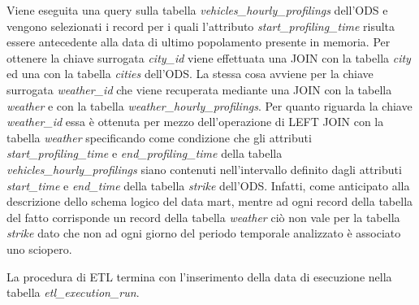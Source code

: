 Viene eseguita una query sulla tabella \textit{vehicles\_hourly\_profilings}
dell'ODS e vengono selezionati i record per i quali l'attributo
\textit{start\_profiling\_time} risulta essere antecedente alla data di ultimo
popolamento presente in memoria. Per ottenere la chiave surrogata \textit{city\_id}
viene effettuata una JOIN con la tabella \textit{city} ed una con la tabella
\textit{cities} dell'ODS. La stessa cosa avviene per la chiave surrogata
\textit{weather\_id} che viene recuperata mediante una JOIN con la tabella
\textit{weather} e con la tabella \textit{weather\_hourly\_profilings}.
Per quanto riguarda la chiave \textit{weather\_id} essa è ottenuta per mezzo
dell'operazione di LEFT JOIN con la tabella \textit{weather} specificando
come condizione che gli attributi \textit{start\_profiling\_time} e
\textit{end\_profiling\_time} della tabella \textit{vehicles\_hourly\_profilings}
siano contenuti nell'intervallo definito dagli attributi \textit{start\_time} e
\textit{end\_time} della tabella \textit{strike} dell'ODS. Infatti, come anticipato
alla descrizione dello schema logico del data mart, mentre ad ogni record della
tabella del fatto corrisponde un record della tabella \textit{weather} ciò non
vale per la tabella \textit{strike} dato che non ad ogni giorno del periodo
temporale analizzato è associato uno sciopero.

La procedura di ETL termina con l'inserimento della data di esecuzione nella
tabella \textit{etl\_execution\_run}.
